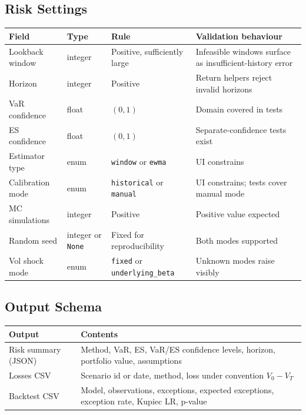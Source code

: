 \documentclass[11pt]{article}
\newcommand{\code}[1]{\texttt{#1}}
\begin{document}
\subsection{Risk Settings}

\begin{center}
\begin{tabular}{L{2.8cm}L{1.8cm}L{3cm}L{4.5cm}}
\toprule
\textbf{Field} & \textbf{Type} & \textbf{Rule} & \textbf{Validation behaviour} \\
\midrule
Lookback window   & integer & Positive, sufficiently large & Infeasible windows surface as insufficient-history error \\
Horizon           & integer & Positive                    & Return helpers reject invalid horizons \\
VaR confidence    & float   & $(0,1)$                     & Domain covered in tests \\
ES confidence     & float   & $(0,1)$                     & Separate-confidence tests exist \\
Estimator type    & enum    & \code{window} or \code{ewma} & UI constrains \\
Calibration mode  & enum    & \code{historical} or \code{manual} & UI constrains; tests cover manual mode \\
MC simulations    & integer & Positive                    & Positive value expected \\
Random seed       & integer or \code{None} & Fixed for reproducibility & Both modes supported \\
Vol shock mode    & enum    & \code{fixed} or \code{underlying\_beta} & Unknown modes raise visibly \\
\bottomrule
\end{tabular}
\end{center}

\subsection{Output Schema}

\begin{center}
\begin{tabular}{L{3.5cm}L{9cm}}
\toprule
\textbf{Output} & \textbf{Contents} \\
\midrule
Risk summary (JSON) & Method, VaR, ES, VaR/ES confidence levels, horizon, portfolio value, assumptions \\
Losses CSV          & Scenario id or date, method, loss under convention $V_0 - V_T$ \\
Backtest CSV        & Model, observations, exceptions, expected exceptions, exception rate, Kupiec LR, p-value \\
\bottomrule
\end{tabular}
\end{center}
\end{document}
